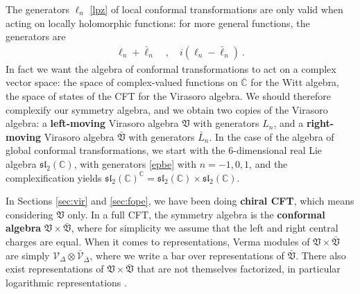 \documentclass[12pt, a4paper]{article}
\newcommand{\myindex}[1]{\textbf{\boldmath #1}}
\theoremstyle{break}
\begin{document}
The generators $\ell_n$ \eqref{lpz} of local conformal transformations are only valid when acting on locally holomorphic functions: for more general functions, the generators are 
\begin{align}
 \ell_n +\bar{\ell}_n \quad , \quad i(\ell_n -\bar \ell_n)\  .
 \label{epbe}
\end{align}
In fact we want the algebra of conformal transformations to act on a complex vector space: the space of complex-valued functions on $\overline{\mathbb{C}}$ for the Witt algebra, the space of states of the CFT for the Virasoro algebra. We should therefore complexify our symmetry algebra, and we obtain two copies of the Virasoro algebra: a \myindex{left-moving}  Virasoro algebra $\mathfrak{V}$ with generators $L_n$, and a \myindex{right-moving} Virasoro algebra $\bar{\mathfrak{V}}$ with generators $\bar{L}_n$. In the case of the algebra of global conformal transformations, we start with the 6-dimensional real Lie algebra $\mathfrak{sl}_2(\mathbb{C})$, with generators \eqref{epbe} with $n=-1,0,1$, and the complexification yields $\mathfrak{sl}_2(\mathbb{C})^\mathbb{C} = \mathfrak{sl}_2(\mathbb{C})\times \mathfrak{sl}_2(\mathbb{C})$.

In Sections \ref{sec:vir} and \ref{sec:fope}, we have been doing \myindex{chiral CFT}, which means considering $\mathfrak{V}$ only. In a full CFT, the symmetry algebra is the \myindex{conformal algebra} $\mathfrak{V}\times \bar{\mathfrak{V}}$, where for simplicity we assume that the left and right central charges are equal. When it comes to representations, Verma modules of $\mathfrak{V}\times \bar{\mathfrak{V}}$ are simply $\mathcal{V}_\Delta\otimes \bar{\mathcal{V}}_{\bar \Delta}$, where we write a bar over representations of $\bar{\mathfrak{V}}$. There also exist representations of $\mathfrak{V}\times \bar{\mathfrak{V}}$ that are not themselves factorized, in particular logarithmic representations \cite{nr20}. 
\end{document}
